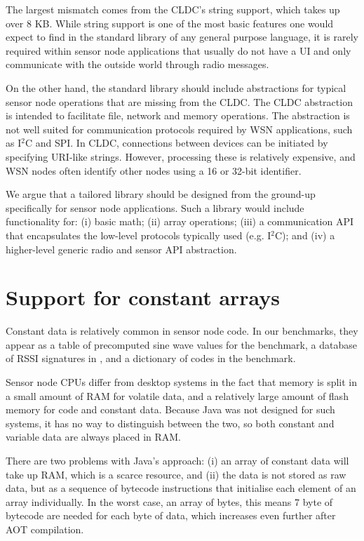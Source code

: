 The largest mismatch comes from the CLDC's string support, which takes up over 8 KB. While string support is one of the most basic features one would expect to find in the standard library of any general purpose language, it is rarely required within sensor node applications that usually do not have a UI and only communicate with the outside world through radio messages.

On the other hand, the standard library should include abstractions for typical sensor node operations that are missing from the CLDC. The CLDC  abstraction is intended to facilitate file, network and memory operations. The abstraction is not well suited for communication protocols required by WSN applications, such as I$^{2}$C and SPI. In CLDC, connections between devices can be initiated by specifying URI-like strings. However, processing these is relatively expensive, and WSN nodes often identify other nodes using a 16 or 32-bit identifier.

We argue that a tailored library should be designed from the ground-up specifically for sensor node applications. Such a library would include functionality for: (i) basic math; (ii) array operations; (iii) a communication API that encapsulates the low-level protocols typically used (e.g. I$^{2}$C); and (iv) a higher-level generic radio and sensor API abstraction.

 



\section{Support for constant arrays}
\label{sec-const-data}
Constant data is relatively common in sensor node code. In our benchmarks, they appear as a table of precomputed sine wave values for the  benchmark, a database of RSSI signatures in , and a dictionary of codes in the  benchmark.

Sensor node CPUs differ from desktop systems in the fact that memory is split in a small amount of RAM for volatile data, and a relatively large amount of flash memory for code and constant data. Because Java was not designed for such systems, it has no way to distinguish between the two, so both constant and variable data are always placed in RAM.

There are two problems with Java's approach: (i) an array of constant data will take up RAM, which is a scarce resource, and (ii) the data is not stored as raw data, but as a sequence of bytecode instructions that initialise each element of an array individually. In the worst case, an array of bytes, this means 7 byte of bytecode are needed for each byte of data, which increases even further after AOT compilation.

